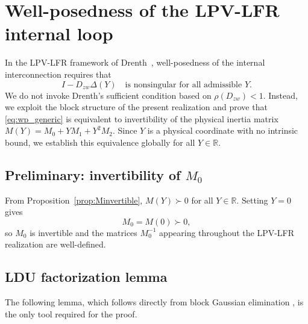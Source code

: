 \documentclass[11pt]{article}
\begin{document}
\section{Well-posedness of the LPV-LFR internal loop}

In the LPV-LFR framework of Drenth~\cite{drenth2025thesis}, well-posedness of the
internal interconnection requires that
\begin{equation}
    I - D_{zw}\Delta(Y)
    \quad\text{is nonsingular for all admissible } Y.
    \label{eq:wp_generic}
\end{equation}
We do not invoke Drenth's sufficient condition based on $\rho(D_{zw})<1$.
Instead, we exploit the block structure of the present realization and prove that
\eqref{eq:wp_generic} is equivalent to invertibility of the physical inertia matrix
$M(Y) = M_0 + YM_1 + Y^2M_2$.
Since $Y$ is a physical coordinate with no intrinsic bound, we establish this
equivalence globally for all $Y\in\mathbb{R}$.

\subsection{Preliminary: invertibility of \texorpdfstring{$M_0$}{M0}}

From Proposition~\ref{prop:Minvertible}, $M(Y)\succ 0$ for all $Y\in\mathbb{R}$.
Setting $Y=0$ gives
\begin{equation}
    M_0 = M(0) \succ 0,
    \label{eq:M0pd}
\end{equation}
so $M_0$ is invertible and the matrices $M_0^{-1}$ appearing throughout the
LPV-LFR realization are well-defined.

\subsection{LDU factorization lemma}

The following lemma, which follows directly from block Gaussian elimination
\cite[p.\,1--2]{schurwiki}, is the only tool required for the proof.
\end{document}
